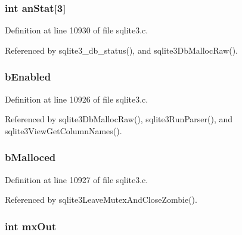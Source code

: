 \subsubsection[{an\+Stat}]{\setlength{\rightskip}{0pt plus 5cm}int an\+Stat\mbox{[}3\mbox{]}}\label{struct_lookaside_a80bed23befd958684c107285728aae2e}


Definition at line 10930 of file sqlite3.\+c.



Referenced by sqlite3\+\_\+db\+\_\+status(), and sqlite3\+Db\+Malloc\+Raw().

\hypertarget{struct_lookaside_a79af6c4320daf4bbfbd9826e21ceaddd}{}
\subsubsection[{b\+Enabled}]{ b\+Enabled}\label{struct_lookaside_a79af6c4320daf4bbfbd9826e21ceaddd}


Definition at line 10926 of file sqlite3.\+c.



Referenced by sqlite3\+Db\+Malloc\+Raw(), sqlite3\+Run\+Parser(), and sqlite3\+View\+Get\+Column\+Names().

\hypertarget{struct_lookaside_a909462308d1ae0363b162f8c83380d34}{}
\subsubsection[{b\+Malloced}]{ b\+Malloced}\label{struct_lookaside_a909462308d1ae0363b162f8c83380d34}


Definition at line 10927 of file sqlite3.\+c.



Referenced by sqlite3\+Leave\+Mutex\+And\+Close\+Zombie().

\hypertarget{struct_lookaside_a44be08721ee9a3463850ba5e8a648442}{}
\subsubsection[{mx\+Out}]{\setlength{\rightskip}{0pt plus 5cm}int mx\+Out}\label{struct_lookaside_a44be08721ee9a3463850ba5e8a648442}


